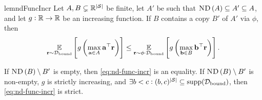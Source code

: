 \begin{restatable}{lem}{ndFuncIncr}\label{lem:nd-func-incr-pwr}
Let $A,B\subsetneq \mathbb{R}^{\left|\mathcal{S}\right|}$ be finite, let $A'$ be such that $\text{\upshape\textsc{ND}}\left(A\right)\subseteq A'\subseteq A$, and let $g:\mathbb{R}\to\mathbb{R}$ be an increasing function. If $B$ contains a copy $B'$ of $A'$ via $\phi$, then
\begin{equation}
    \operatorname*{\mathbb{E}}_{\mathbf{r} \sim \mathcal{D}_{\text{bound}}}\left[g\left(\max_{\mathbf{a}\in A}\mathbf{a}^\top \mathbf{r}\right)\right] \leq \operatorname*{\mathbb{E}}_{\mathbf{r} \sim \phi\cdot \mathcal{D}_{\text{bound}}}\left[g\left(\max_{\mathbf{b}\in B}\mathbf{b}^\top \mathbf{r}\right)\right].\label{eq:nd-func-incr}
\end{equation} 

If $\text{\upshape\textsc{ND}}\left(B\right)\setminus B'$ is empty, then \cref{eq:nd-func-incr} is an equality. If $\text{\upshape\textsc{ND}}\left(B\right)\setminus B'$ is non-empty, $g$ is strictly increasing, and $\exists b<c: (b,c)^{\abs{\St}}\subseteq\supp[\Dbd]$, then \cref{eq:nd-func-incr} is strict.
\end{restatable}
